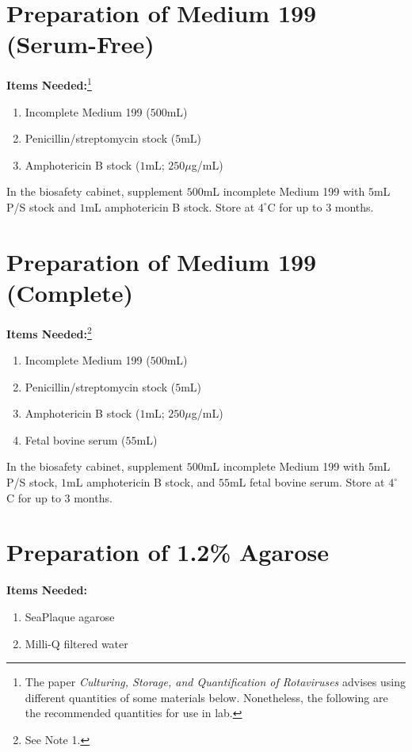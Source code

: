 \section{Preparation of Medium 199 (Serum-Free)}

{\bfseries Items Needed:}\footnote{The paper {\itshape Culturing, Storage, and Quantification of Rotaviruses} advises using different quantities of some materials below. Nonetheless, the following are the recommended quantities for use in lab.} \begin{enumerate}
	\item Incomplete Medium 199 ($500$mL)
	\item Penicillin/streptomycin stock ($5$mL)
	\item Amphotericin B stock ($1$mL; $250\mu$g/mL)
\end{enumerate}

In the biosafety cabinet, supplement $500$mL incomplete Medium 199 with $5$mL P/S stock and $1$mL amphotericin B stock. Store at $4^{\circ}$C for up to 3 months.

\section{Preparation of Medium 199 (Complete)}

{\bfseries Items Needed:}\footnote{See Note 1.} \begin{enumerate}
	\item Incomplete Medium 199 ($500$mL)
	\item Penicillin/streptomycin stock ($5$mL)
	\item Amphotericin B stock ($1$mL; $250\mu$g/mL)
	\item Fetal bovine serum ($55$mL)
\end{enumerate}

In the biosafety cabinet, supplement $500$mL incomplete Medium 199 with $5$mL P/S stock, $1$mL amphotericin B stock, and $55$mL fetal bovine serum. Store at $4^{\circ}$C for up to 3 months.

\section{Preparation of 1.2\% Agarose}

{\bfseries Items Needed:} \begin{enumerate}
	\item SeaPlaque agarose
	\item Milli-Q filtered water
\end{enumerate}

